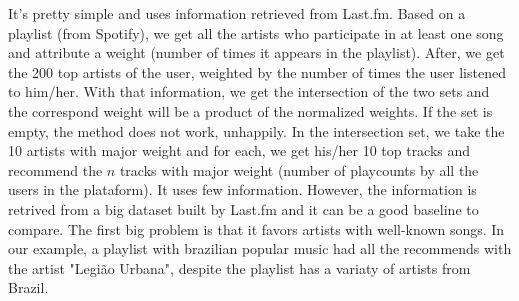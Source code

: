 \documentclass{article}
\begin{document}
It's pretty simple and uses information retrieved from Last.fm. Based on a
playlist (from Spotify), we get all the artists who participate in at least
one song and attribute a weight (number of times it appears in the playlist). After, we get the 200 top artists of the user, weighted by the number of
times the user listened to him/her. With that information, we get the
intersection of the two sets and the correspond weight will be a product of
the normalized weights. If the set is empty, the method does not work, unhappily.
In the intersection set, we take the 10 artists with major weight and for each,
we get his/her 10 top tracks and recommend the $n$ tracks with major weight
(number of playcounts by all the users in the plataform). It uses few information. However, the information is
retrived from a big dataset built by Last.fm and it can be a good baseline to
compare. The first big problem is that it favors artists with well-known
songs. In our example, a playlist with brazilian popular music had all the
recommends with the artist "Legião Urbana", despite the playlist has a variaty
of artists from Brazil. 
\end{document}
